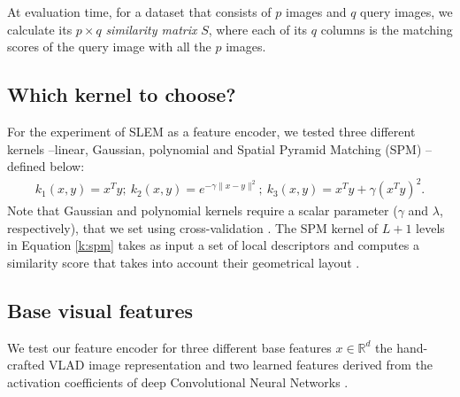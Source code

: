 At evaluation time, for a dataset that consists of $p$ images and $q$ query images, we calculate its $p\times q$ \emph{similarity matrix} $S$, where each of its $q$ columns is the matching scores of the query image with all the $p$ images.


\subsection{Which kernel to choose?}
For the experiment of SLEM as a feature encoder, we tested three different kernels --linear, Gaussian, polynomial and Spatial Pyramid Matching (SPM) -- defined below:
\begin{align}
    k_1(x,y) = x^Ty; \
    k_2(x,y) = e^{-\gamma\|x-y \|^2}; \ 
    k_3(x,y) = x^Ty+\gamma(x^Ty)^2. \label{kernels}
\end{align}
Note that Gaussian and polynomial kernels require a scalar parameter ($\gamma$ and $\lambda$, respectively), that we set using cross-validation .
The SPM kernel of $L+1$ levels in Equation \eqref{k:spm} takes as input a set of local descriptors and computes a similarity score that takes into account their geometrical layout \cite{spk}.


\subsection{Base visual features}
We test our feature encoder for three different base features $x\in\mathbb{R}^d$ the hand-crafted VLAD image representation \cite{Delhumeau2013} and two learned features derived from the activation coefficients of deep Convolutional Neural Networks \cite{Krizhevsky2012,babenko15}.

